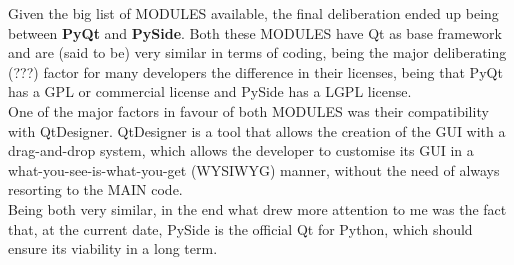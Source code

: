 Given the big list of MODULES available, the final deliberation ended up being between \textbf{PyQt} and \textbf{PySide}. Both these MODULES have  Qt as base framework and are (said to be) very similar in terms of coding, being the major deliberating (???) factor for many developers the difference in their licenses, being that PyQt has a GPL or commercial license and PySide has a LGPL license. \\
	One of the major factors in favour of both MODULES was their compatibility with QtDesigner. QtDesigner is a tool that allows the creation of the GUI with a drag-and-drop system, which allows the developer to customise its GUI in a what-you-see-is-what-you-get (WYSIWYG) manner, without the need of always resorting to the MAIN code.\\
Being both very similar, in the end what drew more attention to me was the fact that, at the current date, PySide is the official Qt for Python, which should ensure its viability in a long term.












